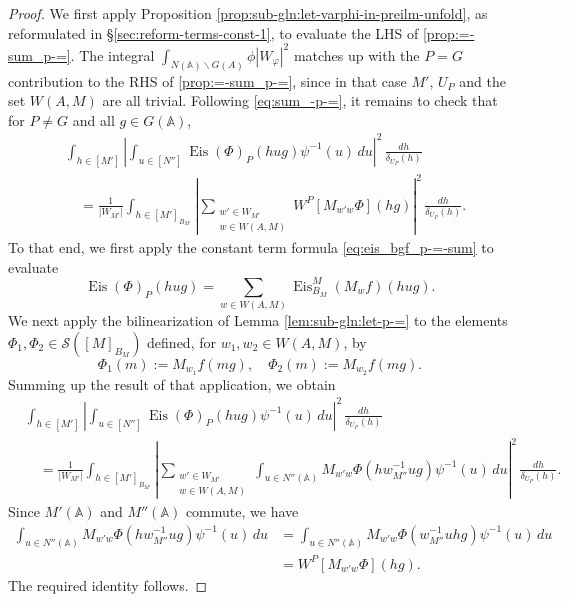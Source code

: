 \documentclass[reqno]{amsart}
\DeclareMathOperator{\Eis}{Eis}
\theoremstyle{plain} \newtheorem{theorem} {Theorem}
\theoremstyle{definition} \newtheorem{definition} [theorem] {Definition}
\theoremstyle{itplain} %
\numberwithin{equation}{section}
\numberwithin{theorem}{section}
\begin{document}
\begin{proof}
We first apply Proposition \ref{prop:sub-gln:let-varphi-in-preilm-unfold}, as reformulated in \S\ref{sec:reform-terms-const-1}, to evaluate the LHS of \eqref{prop:=-sum_p-=}.  The integral $\int _{N(\mathbb{A}) \backslash G(A)} \phi |W_\varphi|^2$ matches up with the $P = G$ contribution to the RHS of \eqref{prop:=-sum_p-=}, since in that case $M'$, $U_P$ and the set $W(A,M)$ are all trivial.  Following \eqref{eq:sum_-p-=}, it remains to check that for $P \neq G$ and all $g \in G(\mathbb{A})$,
\begin{align*}
  &\int _{h \in [M']}
    \left\lvert
    \int _{u \in [N'']}
    \Eis(\Phi)_P(h u g) \psi^{-1}(u) \, d u
    \right\rvert^2 \, \frac{d h}{\delta_{U_P}(h)} \\
  &\quad =
    \frac{1}{|W_{M'}|}
    \int _{h \in [M']_{B_{M'}}}
    \left\lvert
    \sum _{
    \substack{
    w' \in W_{M'}  \\
  w \in W(A,M)
  }
  }
  W^P[M_{w' w} \Phi](h g)
  \right\rvert^2
  \, \frac{d h}{\delta_{U_P}(h)}.
\end{align*}
To that end, we first apply the constant term formula \eqref{eq:eis_bgf_p-=-sum} to evaluate
\begin{equation*}
  \Eis(\Phi)_P(h u g)
  = \sum _{w \in W(A,M)} \Eis_{B_M}^M(M_w f)(h u g).
\end{equation*}
We next apply the bilinearization of Lemma \ref{lem:sub-gln:let-p-=} to the elements $\Phi_1, \Phi_2 \in \mathcal{S}([M]_{B_M})$ defined, for $w_1, w_2 \in W(A,M)$, by
\begin{equation*}
  \Phi_1(m) :=  M_{w_1} f(m g), \quad 
  \Phi_2(m) :=  M_{w_2} f(m g).
\end{equation*}
Summing up the result of that application, we obtain
\begin{align*}
  &\int _{h \in [M']}
    \left\lvert
    \int _{u \in [N'']}
    \Eis(\Phi)_P(h u g) \psi^{-1}(u) \, d u
    \right\rvert^2 \, \frac{d h}{\delta_{U_P}(h)} \\
  &\quad =
    \frac{1}{|W_{M'}|}
    \int _{h \in [M']_{B_{M'}}}
    \left\lvert
    \sum _{
    \substack{
    w' \in W_{M'}  \\
   w \in W(A,M)
  }
  }
  \int _{u \in N''(\mathbb{A})}
  M_{w' w} \Phi (h w_{M''}^{-1} u g)
  \psi^{-1}(u) \, d u
  \right\rvert^2
  \, \frac{d h}{\delta_{U_P}(h)}.
\end{align*}
Since $M'(\mathbb{A})$ and $M''(\mathbb{A})$ commute, we have
\begin{align*}
  \int _{u \in N''(\mathbb{A})}
  M_{w' w} \Phi (h w_{M''}^{-1} u g)
  \psi^{-1}(u) \, d u
  &=
  \int _{u \in N''(\mathbb{A})}
  M_{w' w} \Phi (w_{M''}^{-1} u h g)
    \psi^{-1}(u) \, d u \\
  &= W^P[M_{w' w} \Phi](h g).  
\end{align*}
The required identity follows.
\end{proof}
\end{document}
